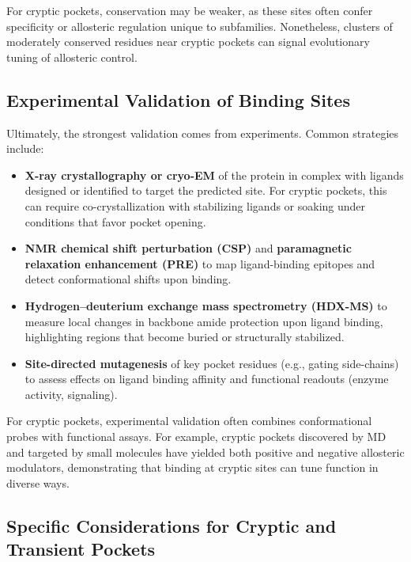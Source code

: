 \documentclass[12pt,a4paper]{article}
\begin{document}
For cryptic pockets, conservation may be weaker, as these sites often confer specificity or allosteric regulation unique to subfamilies. Nonetheless, clusters of moderately conserved residues near cryptic pockets can signal evolutionary tuning of allosteric control.\cite{CH5_Gasparikova2025,CH5_zhang2026decrypting}

\subsection{Experimental Validation of Binding Sites}

Ultimately, the strongest validation comes from experiments. Common strategies include:
\begin{itemize}
    \item \textbf{X-ray crystallography or cryo-EM} of the protein in complex with ligands designed or identified to target the predicted site. For cryptic pockets, this can require co-crystallization with stabilizing ligands or soaking under conditions that favor pocket opening.\cite{CH5_Kuzmanic2020}
    \item \textbf{NMR chemical shift perturbation (CSP)} and \textbf{paramagnetic relaxation enhancement (PRE)} to map ligand-binding epitopes and detect conformational shifts upon binding.
    \item \textbf{Hydrogen--deuterium exchange mass spectrometry (HDX-MS)} to measure local changes in backbone amide protection upon ligand binding, highlighting regions that become buried or structurally stabilized.\cite{CH5_Kuzmanic2020,CH5_Gasparikova2025}
    \item \textbf{Site-directed mutagenesis} of key pocket residues (e.g., gating side-chains) to assess effects on ligand binding affinity and functional readouts (enzyme activity, signaling).
\end{itemize}

For cryptic pockets, experimental validation often combines conformational probes with functional assays. For example, cryptic pockets discovered by MD and targeted by small molecules have yielded both positive and negative allosteric modulators, demonstrating that binding at cryptic sites can tune function in diverse ways.\cite{CH5_amaro2019will,CH5_Gasparikova2025}

\subsection{Specific Considerations for Cryptic and Transient Pockets}
\end{document}
